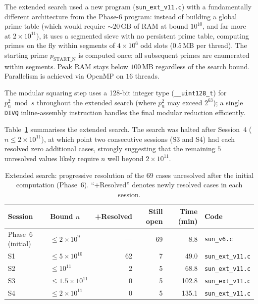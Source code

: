 \documentclass[pdflatex,sn-mathphys-num,Numbered]{sn-jnl}
\theoremstyle{thmstyleone}
\theoremstyle{thmstylethree}
\theoremstyle{thmstyletwo}
\numberwithin{equation}{section}
\begin{document}
The extended search used a new program (\texttt{sun\_ext\_v11.c})
with a fundamentally different architecture from the Phase-6 program:
instead of building a global prime table (which would require
$\sim 20$\,GB of RAM at bound $10^{10}$, and far more at
$2 \times 10^{11}$), it uses a segmented sieve with no persistent
prime table, computing primes on the fly within segments of
$4 \times 10^6$ odd slots ($0.5$\,MB per thread).
The starting prime $p_{\mathrm{START\_N}}$ is computed once; all
subsequent primes are enumerated within segments.
Peak RAM stays below $100$\,MB regardless of the search bound.
Parallelism is achieved via OpenMP on $16$ threads.

The modular squaring step uses a 128-bit integer type
(\texttt{\_\_uint128\_t}) for $p_n^2 \bmod s$ throughout the
extended search (where $p_n^2$ may exceed $2^{63}$);
a single \texttt{DIVQ} inline-assembly instruction handles the
final modular reduction efficiently.

Table~\ref{tab:extended} summarises the extended search.
The search was halted after Session~4 ($n \leq 2 \times 10^{11}$),
at which point two consecutive sessions (S3 and S4) had each resolved
zero additional cases, strongly suggesting that the remaining $5$
unresolved values likely require $n$ well beyond $2 \times 10^{11}$.

\begin{table}[ht]
	\centering
	\caption{Extended search: progressive resolution of the $69$ cases
		unresolved after the initial computation (Phase~6).
		``+Resolved'' denotes newly resolved cases in
		each session.}
	\label{tab:extended}
	\footnotesize
	\begin{tabular}{llrrrl}
		\toprule
		Session & Bound $n$ & +Resolved & Still open & Time (min) & Code \\
		\midrule
		Phase~6 (initial) & $\leq 2 \times 10^9$   & --- & 69 &  8.8 & \texttt{sun\_v6.c} \\
		S1                & $\leq 5 \times 10^{10}$ &  62 &  7 & 49.0 & \texttt{sun\_ext\_v11.c} \\
		S2                & $\leq 10^{11}$          &   2 &  5 & 68.8 & \texttt{sun\_ext\_v11.c} \\
		S3                & $\leq 1.5 \times 10^{11}$ & 0 &  5 & 102.8 & \texttt{sun\_ext\_v11.c} \\
		S4                & $\leq 2 \times 10^{11}$ &   0 &  5 & 135.1 & \texttt{sun\_ext\_v11.c} \\
		\bottomrule
	\end{tabular}
\end{table}
\end{document}
